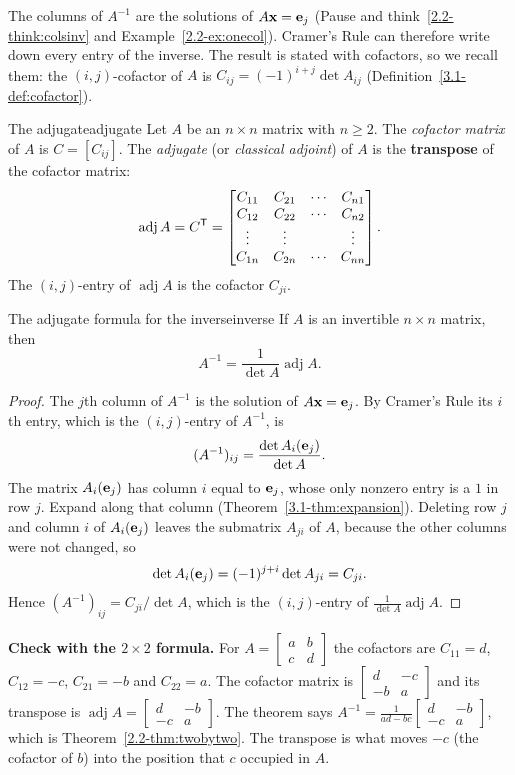 \documentclass[11pt]{article}
\begin{document}
The columns of $A^{-1}$ are the solutions of $A\mathbf{x}=\mathbf{e}_j$ (Pause and think~\ref{2.2-think:colsinv} and Example~\ref{2.2-ex:onecol}). Cramer's Rule can therefore write down every entry of the inverse. The result is stated with cofactors, so we recall them: the $(i,j)$-cofactor of $A$ is $C_{ij}=(-1)^{i+j}\det A_{ij}$ (Definition~\ref{3.1-def:cofactor}).

\begin{defn}{The adjugate}{adjugate}
Let $A$ be an $n\times n$ matrix with $n\geq2$. The \emph{cofactor matrix} of $A$ is $C=[C_{ij}]$. The \emph{adjugate} (or \emph{classical adjoint}) of $A$ is the \textbf{transpose} of the cofactor matrix:
\[
\operatorname{adj}A=C^{\mathsf T}=\begin{bmatrix}C_{11}&C_{21}&\cdots&C_{n1}\\C_{12}&C_{22}&\cdots&C_{n2}\\\vdots&\vdots&&\vdots\\C_{1n}&C_{2n}&\cdots&C_{nn}\end{bmatrix}.
\]
The $(i,j)$-entry of $\operatorname{adj}A$ is the cofactor $C_{ji}$.
\end{defn}

\begin{thm}{The adjugate formula for the inverse}{inverse}
If $A$ is an invertible $n\times n$ matrix, then
\[
A^{-1}=\frac1{\det A}\operatorname{adj}A .
\]
\end{thm}

\begin{proof}
The $j$th column of $A^{-1}$ is the solution of $A\mathbf{x}=\mathbf{e}_j$. By Cramer's Rule its $i$th entry, which is the $(i,j)$-entry of $A^{-1}$, is
\[
(A^{-1})_{ij}=\frac{\det A_i(\mathbf{e}_j)}{\det A}.
\]
The matrix $A_i(\mathbf{e}_j)$ has column $i$ equal to $\mathbf{e}_j$, whose only nonzero entry is a $1$ in row $j$. Expand along that column (Theorem~\ref{3.1-thm:expansion}). Deleting row $j$ and column $i$ of $A_i(\mathbf{e}_j)$ leaves the submatrix $A_{ji}$ of $A$, because the other columns were not changed, so
\[
\det A_i(\mathbf{e}_j)=(-1)^{j+i}\det A_{ji}=C_{ji}.
\]
Hence $(A^{-1})_{ij}=C_{ji}/\det A$, which is the $(i,j)$-entry of $\frac1{\det A}\operatorname{adj}A$.
\end{proof}

\textbf{Check with the $2\times2$ formula.} For $A=\begin{bmatrix}a&b\\c&d\end{bmatrix}$ the cofactors are $C_{11}=d$, $C_{12}=-c$, $C_{21}=-b$ and $C_{22}=a$. The cofactor matrix is $\begin{bmatrix}d&-c\\-b&a\end{bmatrix}$ and its transpose is $\operatorname{adj}A=\begin{bmatrix}d&-b\\-c&a\end{bmatrix}$. The theorem says $A^{-1}=\frac1{ad-bc}\begin{bmatrix}d&-b\\-c&a\end{bmatrix}$, which is Theorem~\ref{2.2-thm:twobytwo}. The transpose is what moves $-c$ (the cofactor of $b$) into the position that $c$ occupied in $A$.
\end{document}
